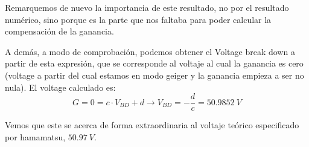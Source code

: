 \begin{itemize}
Remarquemos de nuevo la importancia de este resultado, no por el resultado numérico, sino porque es la parte que nos faltaba para poder calcular la compensación de la ganancia.

A demás, a modo de comprobación, podemos obtener el Voltage break down a partir de esta expresión, que se corresponde al voltaje al cual la ganancia es cero (voltage a partir del cual estamos en modo geiger y la ganancia empieza a ser no nula). El voltage calculado es: 
\begin{equation}
G=0=c \cdot V_{BD} +d \longrightarrow V_{BD}=-\frac{d}{c}=50.9852~V
\label{ajustebdv}
\end{equation}

Vemos que este se acerca de forma extraordinaria al voltaje teórico especificado por hamamatsu, $50.97~V$.
\end{itemize}